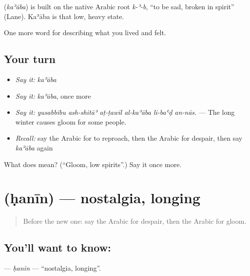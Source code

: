 \begin{cousinweb}
\textbf{} (\emph{kaʾāba}) is built on the native Arabic root \emph{k-ʾ-b}, \textquotedblleft{}to be sad, broken in spirit\textquotedblright{} (Lane). Kaʾāba is that low, heavy state.
\end{cousinweb}

\begin{grammarlens}[title={What you've built}]
One more word for describing what you lived and felt.
\end{grammarlens}

\subsection*{Your turn}
\begin{itemize}
\raggedright
  \item \emph{Say it:} \emph{kaʾāba}
  \item \emph{Say it:} \emph{kaʾāba}, once more
  \item \emph{Say it:} \emph{yusabbibu ash-shitāʾ aṭ-ṭawīl al-kaʾāba li-baʿḍ an-nās.} — The long winter causes gloom for some people.
  \item \emph{Recall:} say the Arabic for to reproach, then the Arabic for despair, then say \emph{kaʾāba} again
\end{itemize}

\begin{tcolorbox}[breakable,colback=teal!4,colframe=teal!35!black,title={Before you move on}]
What does  mean? (\textquotedblleft{}Gloom, low spirits\textquotedblright{}.) Say it once more.
\end{tcolorbox}
\section[\texorpdfstring{\ar{حنين} (ḥanīn)}{حنين (ḥanīn)}]{ (ḥanīn) — nostalgia, longing}

\label{lesson:AR-C494-hanin}



\begin{quote}
Before the new one: say the Arabic for despair, then the Arabic for gloom.
\end{quote}

\subsection*{You'll want to know: }
\textbf{} — \emph{ḥanīn} — \textquotedblleft{}nostalgia, longing\textquotedblright{}.

